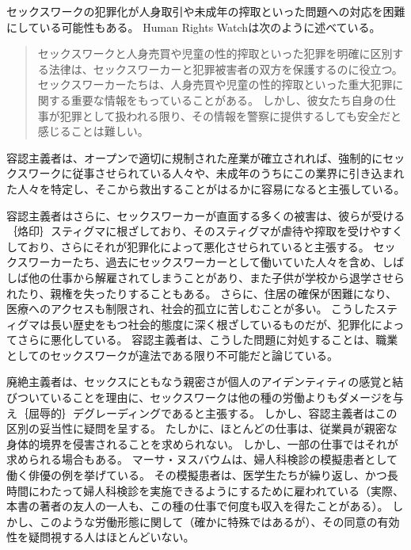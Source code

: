 \documentclass[paper=a4,book,openany]{jlreq}
\begin{document}
セックスワークの犯罪化が人身取引や未成年の搾取といった問題への対応を困難にしている可能性もある。
Human Rights Watchは次のように述べている。

\begin{quote}
セックスワークと人身売買や児童の性的搾取といった犯罪を明確に区別する法律は、セックスワーカーと犯罪被害者の双方を保護するのに役立つ。
セックスワーカーたちは、人身売買や児童の性的搾取といった重大犯罪に関する重要な情報をもっていることがある。
しかし、彼女たち自身の仕事が犯罪として扱われる限り、その情報を警察に提供するしても安全だと感じることは難しい。
\citep{watch19:_why_sex_work_shoul_be_decrim}
\end{quote}

容認主義者は、オープンで適切に規制された産業が確立されれば、強制的にセックスワークに従事させられている人々や、未成年のうちにこの業界に引き込まれた人々を特定し、そこから救出することがはるかに容易になると主張している\citep{albright17:_decreas_human_traff_sex_work_decrim}。

容認主義者はさらに、セックスワーカーが直面する多くの被害は、彼らが受ける｛烙印｝{スティグマ}に根ざしており、そのスティグマが虐待や搾取を受けやすくしており、さらにそれが犯罪化によって悪化させられていると主張する。
セックスワーカーたち、過去にセックスワーカーとして働いていた人々を含め、しばしば他の仕事から解雇されてしまうことがあり、また子供が学校から退学させられたり、親権を失ったりすることもある。
さらに、住居の確保が困難になり、医療へのアクセスも制限され、社会的孤立に苦しむことが多い\citep{stardust17:_stigm_sex_work_comes_high_cost}。
こうしたスティグマは長い歴史をもつ社会的態度に深く根ざしているものだが、犯罪化によってさらに悪化している。
容認主義者は、こうした問題に対処することは、職業としてのセックスワークが違法である限り不可能だと論じている。

廃絶主義者は、セックスにともなう親密さが個人のアイデンティティの感覚と結びついていることを理由に、セックスワークは他の種の労働よりもダメージを与え｛屈辱的｝{デグレーディング}であると主張する。
しかし、容認主義者はこの区別の妥当性に疑問を呈する。
たしかに、ほとんどの仕事は、従業員が親密な身体的境界を侵害されることを求められない。
しかし、一部の仕事ではそれが求められる場合もある。
マーサ・ヌスバウムは、婦人科検診の模擬患者として働く俳優の例を挙げている\citep{nussbaum98:_wheth_reason_prejud}。
その模擬患者は、医学生たちが繰り返し、かつ長時間にわたって婦人科検診を実施できるようにするために雇われている（実際、本書の著者の友人の一人も、この種の仕事で何度も収入を得たことがある）。
しかし、このような労働形態に関して（確かに特殊ではあるが）、その同意の有効性を疑問視する人はほとんどいない。
\end{document}

